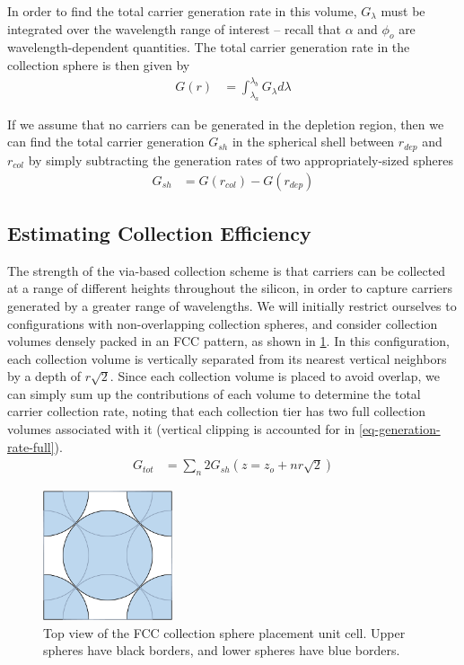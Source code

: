 \documentclass[journal,twoside]{IEEEtran}
\begin{document}
In order to find the total carrier generation rate in this volume, $G_\lambda$ must be integrated over the wavelength range of interest --
recall that $\alpha$ and $\phi_o$ are wavelength-dependent quantities. The total carrier generation rate in the collection sphere is
then given by
\begin{align}
	G(r) &= \int_{\lambda_a}^{\lambda_b} G_\lambda d\lambda
\end{align}

If we assume that no carriers can be generated in the depletion region, then we can find the total carrier generation $G_{sh}$ in the spherical
shell between $r_{dep}$ and $r_{col}$ by simply subtracting the generation rates of two appropriately-sized spheres
\begin{align}
	G_{sh} &= G(r_{col}) - G(r_{dep})	\label{eq-generation-rate-shell}
\end{align}

\subsection{Estimating Collection Efficiency}
The strength of the via-based collection scheme is that carriers can be collected at a range of different heights
throughout the silicon, in order to capture carriers generated by a greater range of wavelengths. We will initially restrict
ourselves to configurations with non-overlapping collection spheres, and consider collection
volumes densely packed in an FCC pattern, as shown in \cref{f-collection-volume-stack}. In this configuration, each collection volume
is vertically separated from its nearest vertical neighbors by a depth of $r\sqrt{2}$. Since each collection volume is placed
to avoid overlap, we can simply sum up the contributions of each volume to determine the total carrier collection rate, noting
that each collection tier has two full collection volumes associated with it (vertical clipping is accounted for in
\cref{eq-generation-rate-full}).
\begin{align}
	G_{tot} &= \sum_n 2G_{sh}(z=z_o + nr\sqrt{2})	\label{eq-generation-rate-unit-cell}
\end{align}

\begin{figure}[tb]
	\centering
	\includegraphics[width=1.5in]{figures/fcc_top_view.png}
	\caption{	Top view of the FCC collection sphere placement unit cell. Upper spheres have black borders,
				and lower spheres have blue borders.}
	\label{f-collection-volume-stack}
\end{figure}
\end{document}
